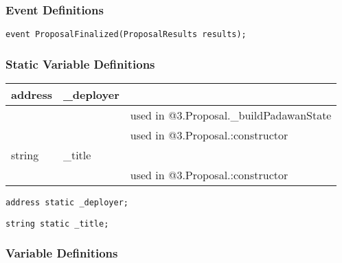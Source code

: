 \subsubsection{Event Definitions}


\begin{lstlisting}[firstnumber=23]
    event ProposalFinalized(ProposalResults results);
\end{lstlisting}

\subsubsection{Static Variable Definitions}


\ifsoltables
\noindent\begin{tabular}{|l|l|p{5cm}|}\hline
address & \_{}deployer &  \\\hline
 & & used in @3.Proposal.\_{}buildPadawanState\\\hline
 & & used in @3.Proposal.:constructor\\\hline
string & \_{}title &  \\\hline
 & & used in @3.Proposal.:constructor\\\hline
\end{tabular}
\fi


\begin{lstlisting}[firstnumber=13]
    address static _deployer;
\end{lstlisting}

\begin{lstlisting}[firstnumber=14]
    string static _title;
\end{lstlisting}

\subsubsection{Variable Definitions}


